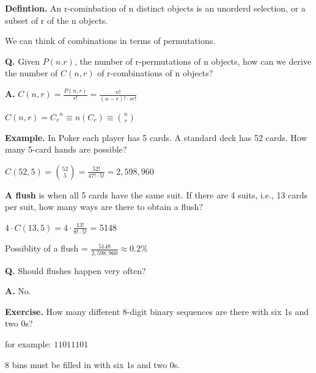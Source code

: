 \documentclass{article}
\begin{document}
\textbf{Defintion.} An r-cominbation of n distinct objects is an unorderd selection, or a subset of r of the n objects.

We can think of combinations in terms of permutations.

\vspace{1cm}

\textbf{Q.} Given $P(n.r)$, the number of r-permutations of n objects, how can we derive the number of $C(n,r)$ of r-combinations of n objects?

\vspace{0.3cm}

\textbf{A.} $C(n,r) = \displaystyle\frac{P(n,r)}{r!} = \displaystyle\frac{n!}{(n-r)!\cdot sr!}$

\vspace{0.3cm}

$C(n,r) = {C_r}^n \equiv n(C_r) \equiv {n \choose r}$

\pagebreak

\text{}

\textbf{Example.} In Poker each player has 5 cards. A standard deck has 52 cards. How many 5-card hands are possible?

$C(52,5) = {52 \choose 5} = \displaystyle\frac{52!}{47! \cdot 5!} = 2,598,960$

\vspace{0.5cm}

\textbf{A flush} is when all 5 cards have the same suit. If there are 4 suits, i.e., 13 cards per suit, how many ways are there to obtain a flush?

\vspace{0.3cm}

$4 \cdot C(13,5) = 4 \cdot \displaystyle\frac{13!}{8! \cdot 5!}$ = 5148

Possiblity of a flush = $\displaystyle\frac{5148}{2,598,960} \approx 0.2\%$

\vspace{0.5cm}

\textbf{Q.} Should flushes happen very often?

\textbf{A.} No.

\vspace{0.5cm}

\textbf{Exercise.} How many different 8-digit binary sequences are there with six 1s and two 0s?

for example: $11011101$

8 bins must be filled in with six 1s and two 0s.

\vspace{0.3cm}
\end{document}
